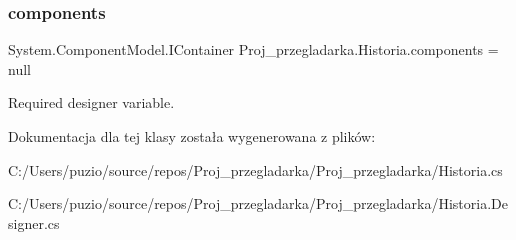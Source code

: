 \subsubsection{\texorpdfstring{components}{components}}
{\footnotesize\ttfamily System.\+Component\+Model.\+I\+Container Proj\+\_\+przegladarka.\+Historia.\+components = null\hspace{0.3cm}{\ttfamily [private]}}



Required designer variable. 



Dokumentacja dla tej klasy została wygenerowana z plików\+:\begin{DoxyCompactItemize}
\item 
C\+:/\+Users/puzio/source/repos/\+Proj\+\_\+przegladarka/\+Proj\+\_\+przegladarka/Historia.\+cs\item 
C\+:/\+Users/puzio/source/repos/\+Proj\+\_\+przegladarka/\+Proj\+\_\+przegladarka/Historia.\+Designer.\+cs\end{DoxyCompactItemize}
